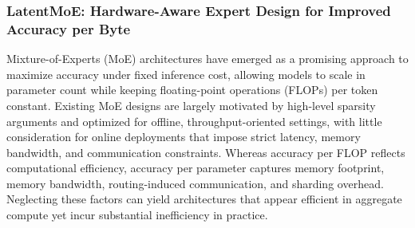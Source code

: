 




\subsubsection{LatentMoE: Hardware-Aware Expert Design for Improved Accuracy per Byte} \label{sec:latent_moe}
Mixture-of-Experts (MoE) architectures have emerged as a promising approach to maximize accuracy under fixed inference cost, allowing models to scale in parameter count while keeping floating-point operations (FLOPs) per token constant.
Existing MoE designs are largely motivated by high-level sparsity arguments and optimized for offline, throughput-oriented settings, with little consideration for online deployments that impose strict latency, memory bandwidth, and communication constraints.
Whereas accuracy per FLOP reflects computational efficiency, accuracy per parameter captures memory footprint, memory bandwidth, routing-induced communication, and sharding overhead.
Neglecting these factors can yield architectures that appear efficient in aggregate compute yet incur substantial inefficiency in practice.

